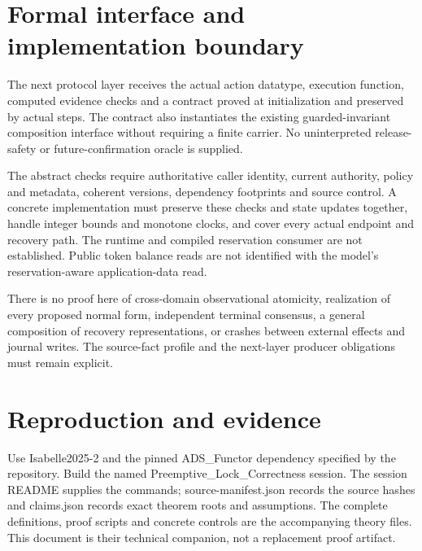 \documentclass[11pt,a4paper]{article}
\begin{document}
\section{Formal interface and implementation boundary}

The next protocol layer receives the actual action datatype, execution
function, computed evidence checks and a contract proved at initialization
and preserved by actual steps. The contract also instantiates the existing
guarded-invariant composition interface without requiring a finite carrier.
No uninterpreted release-safety or future-confirmation oracle is supplied.

The abstract checks require authoritative caller identity, current authority,
policy and metadata, coherent versions, dependency footprints and source
control. A concrete implementation must preserve these checks and state
updates together, handle integer bounds and monotone clocks, and cover every
actual endpoint and recovery path. The runtime and compiled reservation
consumer are not established. Public token balance reads are not identified
with the model's reservation-aware application-data read.

There is no proof here of cross-domain observational atomicity, realization
of every proposed normal form, independent terminal consensus, a general
composition of recovery representations, or crashes between external effects
and journal writes. The source-fact profile and the next-layer producer
obligations must remain explicit.

\section{Reproduction and evidence}

Use Isabelle2025-2 and the pinned ADS\_Functor dependency specified by the
repository. Build the named Preemptive\_Lock\_Correctness session. The session
README supplies the commands; source-manifest.json records the source hashes
and claims.json records exact theorem roots and assumptions. The complete
definitions, proof scripts and concrete controls are the accompanying theory
files. This document is their technical companion, not a replacement proof
artifact.




\end{document}
